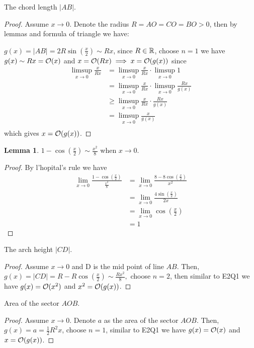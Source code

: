 \documentclass{homework}
\newcommand{\R}{\bb{R}} %
\newcommand{\?}{\stackrel{?}{=}}
\theoremstyle{definition}
\newtheorem*{lemma}{Lemma}
\begin{document}
\question[1] The chord length $|AB|$.

\begin{proof}
    Assume $x\to0$. Denote the radius $R=AO=CO=BO>0$, then by lemmas and formula of triangle we have:

    \(g(x)=|AB|=2R\sin(\frac{x}2)\sim Rx\), since $R\in\R$, choose $n=1$ we have \(g(x)\sim Rx=\cal{O}(x)\) and $x=\cal{O}(Rx)\implies x=\cal{O}(g(x))$ since \begin{align*}
        \limsup_{x\to0}\frac{x}{Rx}&=\limsup_{x\to0}\frac{x}{Rx}\cdot\limsup_{x\to0}1\\
        &=\limsup_{x\to0}\frac{x}{Rx}\cdot\limsup_{x\to0}\frac{Rx}{g(x)}\\
        &\geq\limsup_{x\to0}\frac{x}{Rx}\cdot\frac{Rx}{g(x)}\\
        &=\limsup_{x\to0}\frac{x}{g(x)}\\
    \end{align*} which gives $x=\cal{O}(g(x))$.
\end{proof}


\begin{lemma}
    $1-\cos(\frac{x}2)\sim \frac{x^2}8$ when $x\to0$.

    \begin{proof}
        By l'hopital's rule we have \begin{align*}
            \lim_{x\to0}\frac{1-\cos(\frac{x}2)}{\frac{x^2}8}&=\lim_{x\to0}\frac{8-8\cos(\frac{x}2)}{x^2}\\
            &=\lim_{x\to0}\frac{4\sin(\frac{x}2)}{2x}\\
            &=\lim_{x\to0}\cos(\frac{x}2)\\
            &=1
        \end{align*}
    \end{proof}
\end{lemma}

\question[2] The arch height $|CD|$.
\begin{proof}
    Assume $x\to0$ and D is the mid point of line $AB$. Then, $g(x)=|CD|=R-R\cos(\frac{x}2)\sim \frac{Rx^2}{8},$ choose $n=2$, then similar to E2Q1 we have $g(x)=\cal{O}(x^2)$ and $x^2=\cal{O}(g(x))$. 
\end{proof}

\question[3] Area of the sector $AOB$.

\begin{proof}
    Assume $x\to0$. Denote $a$ as the area of the sector $AOB$. Then, $g(x)=a=\frac12R^2x$, choose $n=1$, similar to E2Q1 we have $g(x)=\cal{O}(x)$ and $x=\cal{O}(g(x))$. 
\end{proof}
\end{document}

